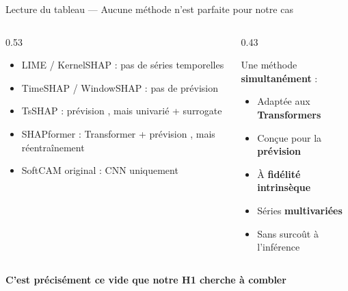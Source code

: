 \documentclass[10pt]{beamer}
\begin{document}
\begin{frame}{Lecture du tableau --- Aucune méthode n'est parfaite pour notre cas}
  \begin{columns}
    \begin{column}{0.53\textwidth}
      \begin{tcolorbox}[
        colback=red!3, colframe=red!60!black,
        arc=2mm, boxrule=0.5pt, fonttitle=\bfseries,
        title={Ce que le tableau révèle}]
        \begin{itemize}
          \item LIME / KernelSHAP : pas de séries temporelles
          \item TimeSHAP / WindowSHAP : pas de prévision
          \item TsSHAP : prévision \checkmark, mais univarié + surrogate
          \item SHAPformer : Transformer + prévision \checkmark, mais réentraînement
          \item SoftCAM original : CNN uniquement
        \end{itemize}
      \end{tcolorbox}
    \end{column}
    \begin{column}{0.43\textwidth}
      \begin{tcolorbox}[
        colback=green!3, colframe=green!40!black,
        arc=2mm, boxrule=0.5pt, fonttitle=\bfseries,
        title={Ce qui manque dans la littérature}]
        Une méthode \textbf{simultanément} :
        \begin{itemize}
          \item[\checkmark] Adaptée aux \textbf{Transformers}
          \item[\checkmark] Conçue pour la \textbf{prévision}
          \item[\checkmark] À \textbf{fidélité intrinsèque}
          \item[\checkmark] Séries \textbf{multivariées}
          \item[\checkmark] Sans surcoût à l'inférence
        \end{itemize}
      \end{tcolorbox}
    \end{column}
  \end{columns}

  \vspace{4pt}
    \centering
    \textbf{C'est précisément ce vide que notre H1 cherche à combler}

\end{frame}
\end{document}
